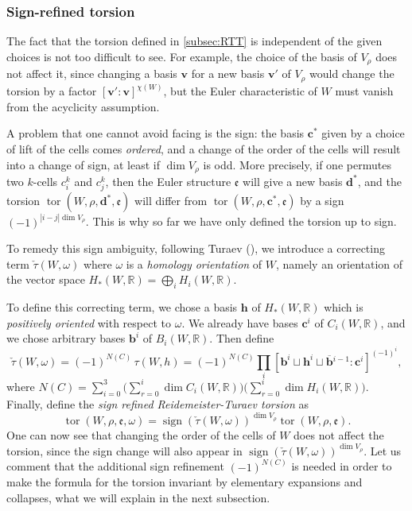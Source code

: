 \documentclass[10pt]{amsart}
\theoremstyle{plain}
\theoremstyle{definition}
\theoremstyle{remark}
\newcommand{\R}{\mathbb{R}}
\DeclareMathOperator{\sign}{sign}
\numberwithin{equation}{section}
\DeclareMathOperator{\tor}{tor}
\begin{document}
\subsubsection{Sign-refined torsion}
The fact that the torsion defined in \cref{subsec:RTT} is independent of the given choices is not too difficult to see. For example, the choice of the basis of $V_\rho$ does not affect it, since changing a basis $\boldsymbol v$ for a new basis $\boldsymbol v'$ of $V_\rho$ would change the torsion by a factor $[\boldsymbol v' \colon \boldsymbol v]^{\chi(W)}$, but the Euler characteristic of $W$ must vanish from the acyclicity assumption.

A problem that one cannot avoid facing is the sign: the basis $\boldsymbol c^*$ given by a choice of lift of the cells comes \emph{ordered}, and a change of the order of the cells will result into a change of sign, at least if $\dim V_\rho$ is odd. More precisely, if one permutes two $k$-cells $c^k_i$ and $c^k_j$, then the Euler structure $\mathfrak e$ will give a new basis $\boldsymbol d^*$, and the torsion $\tor(W, \rho, \boldsymbol d^*, \mathfrak e)$ will differ from $\tor(W, \rho, \boldsymbol c^*, \mathfrak e)$ by a sign $(-1)^{|i-j| \dim V_\rho}$. This is why so far we have only defined the torsion up to sign.

To remedy this sign ambiguity, following Turaev (\cite[Ch.\,III, \S 18]{Turaev_book}), we introduce a correcting term $\check \tau(W, \omega)$ where $\omega$ is a \emph{homology orientation} of $W$, namely an orientation of the vector space $H_*(W, \R) = \bigoplus_i H_i(W, \R)$.

To define this correcting term, we chose a basis $\boldsymbol h$ of $H_*(W, \R)$ which is \emph{positively oriented} with respect to $\omega$. We already have bases $\boldsymbol c^i$ of $C_i(W, \R)$, and we chose arbitrary bases $\boldsymbol b^i$ of $B_i(W, \R)$. Then define
\[
\check \tau(W, \omega) = (-1)^{N(C)} \, \tau(W, h) = (-1)^{N(C)} \prod_i [\boldsymbol b^i \sqcup \boldsymbol h^i \sqcup \boldsymbol{\overline b}{}^{i-1} \colon \boldsymbol{c}^i]^{(-1)^i},
\]
where $N(C) = \sum_{i=0}^3 \bigl(\sum_{r=0}^i \dim C_i(W, \R)\bigr)\bigl(\sum_{r=0}^i \dim H_i(W, \R)\bigr)$.
Finally, define the \emph{sign refined Reidemeister-Turaev torsion} as
\[
\tor(W,\rho, \mathfrak e, \omega) = \sign(\check \tau(W, \omega))^{\dim V_\rho} \tor(W, \rho, \mathfrak e).
\]
One can now see that changing the order of the cells of $W$ does not affect the torsion, since the sign change will also appear in $\sign(\check \tau(W, \omega))^{\dim V_\rho}$. Let us comment that the additional sign refinement $(-1)^{N(C)}$ is needed in order to make the formula for the torsion invariant by elementary expansions and collapses, what we will explain in the next subsection.
\end{document}
